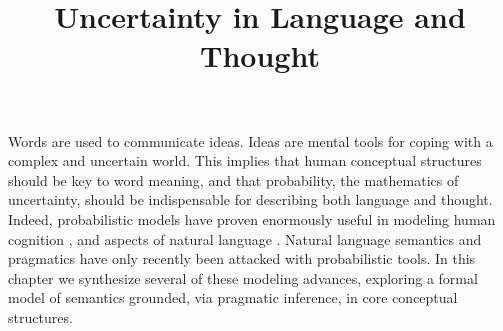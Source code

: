 \documentclass[12pt]{article}
\title{Uncertainty in Language and Thought}
\begin{document}
\listoftodos
\pagebreak


\maketitle

\abstract{}


\pagebreak

\tableofcontents

\pagebreak



Words are used to communicate ideas. Ideas are mental tools for coping with a complex and uncertain world. This implies that human conceptual structures should be key to word meaning, and that probability, the mathematics of uncertainty, should be indispensable for describing both language and thought. Indeed, probabilistic models have proven enormously useful in modeling human cognition \cite{Tenenbaum, etc}, and aspects of natural language \cite{ChaterManning}. Natural language semantics and pragmatics have only recently been attacked with probabilistic tools. In this chapter we synthesize several of these modeling advances, exploring a formal model of semantics grounded, via pragmatic inference, in core conceptual structures.



%
\end{document}
